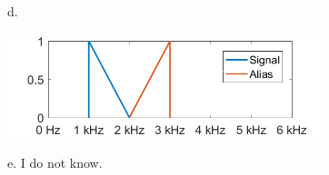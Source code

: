
d. 

\includegraphics[width=3.60817in,height=1.19544in]{../../Images/SamplingAndAliasingQ5d.png}


e. I do not know. \\

